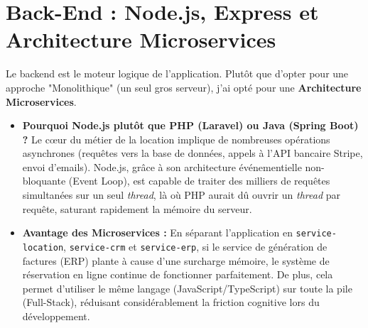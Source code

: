 \section{Back-End : Node.js, Express et Architecture Microservices}
Le backend est le moteur logique de l'application. Plutôt que d'opter pour une approche "Monolithique" (un seul gros serveur), j'ai opté pour une \textbf{Architecture Microservices}.
\begin{itemize}
    \item \textbf{Pourquoi Node.js plutôt que PHP (Laravel) ou Java (Spring Boot) ?} Le cœur du métier de la location implique de nombreuses opérations asynchrones (requêtes vers la base de données, appels à l'API bancaire Stripe, envoi d'emails). Node.js, grâce à son architecture événementielle non-bloquante (Event Loop), est capable de traiter des milliers de requêtes simultanées sur un seul \textit{thread}, là où PHP aurait dû ouvrir un \textit{thread} par requête, saturant rapidement la mémoire du serveur.
    \item \textbf{Avantage des Microservices :} En séparant l'application en \texttt{service-location}, \texttt{service-crm} et \texttt{service-erp}, si le service de génération de factures (ERP) plante à cause d'une surcharge mémoire, le système de réservation en ligne continue de fonctionner parfaitement. De plus, cela permet d'utiliser le même langage (JavaScript/TypeScript) sur toute la pile (Full-Stack), réduisant considérablement la friction cognitive lors du développement.
\end{itemize}

